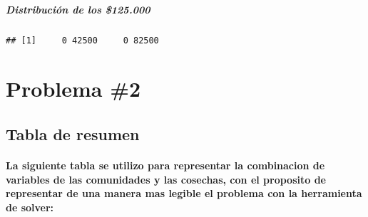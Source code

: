 \documentclass[
]{article}
\newenvironment{Shaded}{\begin{snugshade}}{\end{snugshade}}
\newcommand{\CommentTok}[1]{\textcolor[rgb]{0.56,0.35,0.01}{\textit{#1}}}
\newcommand{\NormalTok}[1]{#1}
\newcommand{\OperatorTok}[1]{\textcolor[rgb]{0.81,0.36,0.00}{\textbf{#1}}}
\begin{document}
\hypertarget{distribuciuxf3n-de-los-125.000-1}{%
\subparagraph{Distribución de los
\$125.000}\label{distribuciuxf3n-de-los-125.000-1}}

\begin{Shaded}
\end{Shaded}

\begin{verbatim}
## [1]     0 42500     0 82500
\end{verbatim}

\begin{Shaded}
\end{Shaded}

\hypertarget{problema-2}{%
\section{Problema \#2}\label{problema-2}}

\hypertarget{tabla-de-resumen}{%
\subsection{Tabla de resumen}\label{tabla-de-resumen}}

\hypertarget{la-siguiente-tabla-se-utilizo-para-representar-la-combinacion-de-variables-de-las-comunidades-y-las-cosechas-con-el-proposito-de-representar-de-una-manera-mas-legible-el-problema-con-la-herramienta-de-solver}{%
\paragraph{La siguiente tabla se utilizo para representar la combinacion
de variables de las comunidades y las cosechas, con el proposito de
representar de una manera mas legible el problema con la herramienta de
solver:}\label{la-siguiente-tabla-se-utilizo-para-representar-la-combinacion-de-variables-de-las-comunidades-y-las-cosechas-con-el-proposito-de-representar-de-una-manera-mas-legible-el-problema-con-la-herramienta-de-solver}}
\end{document}
